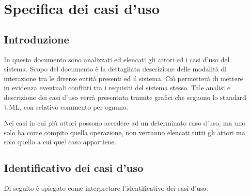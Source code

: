 \chapter{Specifica dei casi d'uso}

\section{Introduzione}
In questo documento sono analizzati ed elencati gli attori ed i casi d'uso del sistema.
Scopo del documento è la dettagliata descrizione delle modalità di interazione tra le diverse entità presenti ed il sistema.
Ciò permetterà di mettere in evidenza eventuali conflitti tra i requisiti del sistema stesso.
Tale analisi e descrizione dei casi d'uso verrà presentata tramite grafici che seguono lo standard UML, con relativo commento per ognuno.

Nei casi in cui più attori possono accedere ad un determinato caso d’uso, ma uno
solo ha come compito quella operazione, non verranno elencati tutti gli attori
ma solo quello a cui quel caso appartiene.

\section{Identificativo dei casi d'uso} %
Di seguito è spiegato come interpretare l'identificativo dei casi d'uso:
\begin{center}
\end{center}

